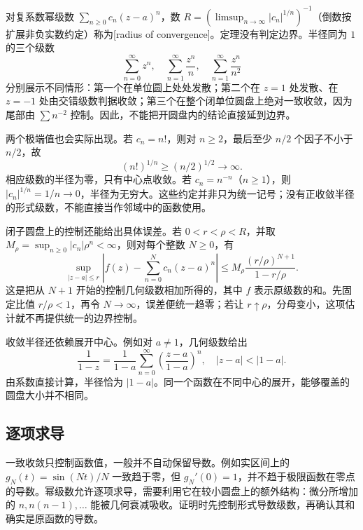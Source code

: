 对复系数幂级数 \(\sum_{n\ge0}c_n(z-a)^n\)，数 \(R=(\limsup_{n\to\infty}|c_n|^{1/n})^{-1}\)（倒数按扩展非负实数约定）称为[radius of convergence]。定理没有判定边界。半径同为 \(1\) 的三个级数
\[
\sum_{n=0}^\infty z^n,\quad
\sum_{n=1}^\infty\frac{z^n}{n},\quad
\sum_{n=1}^\infty\frac{z^n}{n^2}
\]
分别展示不同情形：第一个在单位圆上处处发散；第二个在 \(z=1\) 处发散、在 \(z=-1\) 处由交错级数判据收敛；第三个在整个闭单位圆盘上绝对一致收敛，因为尾部由 \(\sum n^{-2}\) 控制。因此，不能把开圆盘内的结论直接延到边界。

\ProseParagraphBreak

两个极端值也会实际出现。若 \(c_n=n!\)，则对 \(n\ge2\)，最后至少 \(n/2\) 个因子不小于 \(n/2\)，故
\[
 (n!)^{1/n}\ge(n/2)^{1/2}\longrightarrow\infty.
\]
相应级数的半径为零，只有中心点收敛。若 \(c_n=n^{-n}\)（\(n\ge1\)），则 \(|c_n|^{1/n}=1/n\to0\)，半径为无穷大。这些约定并非只为统一记号；没有正收敛半径的形式级数，不能直接当作邻域中的函数使用。

\ProseParagraphBreak

闭子圆盘上的控制还能给出具体误差。若 \(0<r<\rho<R\)，并取 \(M_\rho=\sup_{n\ge0}|c_n|\rho^n<\infty\)，则对每个整数 \(N\ge0\)，有
\begin{equation}\label{b3:eq:01-power-tail}
 \sup_{|z-a|\le r}\left|f(z)-\sum_{n=0}^{N}c_n(z-a)^n\right|
 \le M_\rho\frac{(r/\rho)^{N+1}}{1-r/\rho}.
\end{equation}
这是把从 \(N+1\) 开始的控制几何级数相加所得的，其中 \(f\) 表示原级数的和。先固定比值 \(r/\rho<1\)，再令 \(N\to\infty\)，误差便统一趋零；若让 \(r\uparrow\rho\)，分母变小，这项估计就不再提供统一的边界控制。

\ProseParagraphBreak

收敛半径还依赖展开中心。例如对 \(a\neq1\)，几何级数给出
\[
\frac1{1-z}=\frac1{1-a}\sum_{n=0}^\infty
\left(\frac{z-a}{1-a}\right)^n,
\quad |z-a|<|1-a|.
\]
由系数直接计算，半径恰为 \(|1-a|\)。同一个函数在不同中心的展开，能够覆盖的圆盘大小并不相同。

\subsection{逐项求导}
\label{b3:subsec:010202}

一致收敛只控制函数值，一般并不自动保留导数。例如实区间上的 \(g_N(t)=\sin(Nt)/N\) 一致趋于零，但 \(g_N'(0)=1\)，并不趋于极限函数在零点的导数。幂级数允许逐项求导，需要利用它在较小圆盘上的额外结构：微分所增加的 \(n,n(n-1),\ldots\) 能被几何衰减吸收。证明时先控制形式导数级数，再确认其和确实是原函数的导数。

